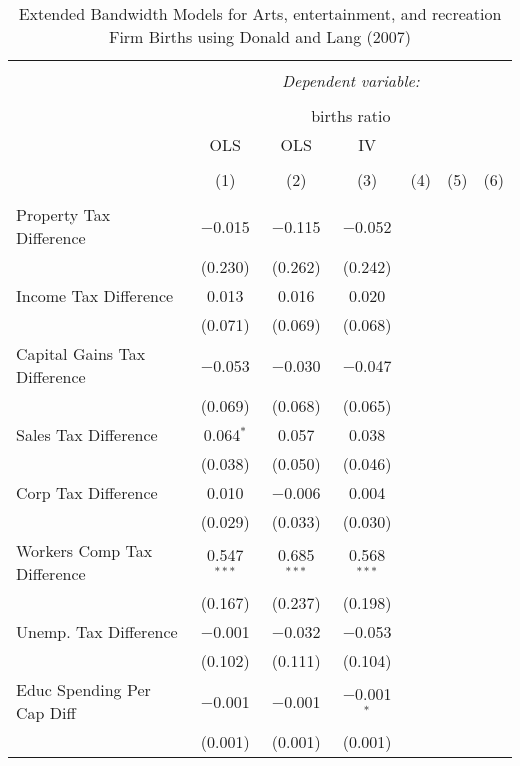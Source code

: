 
\begin{table}[!htbp] \centering 
  \caption{Extended Bandwidth Models for  Arts, entertainment, and recreation Firm Births using Donald and Lang (2007)} 
  \label{} 
\begin{tabular}{@{\extracolsep{5pt}}lcccccc} 
\\[-1.8ex]\hline 
\hline \\[-1.8ex] 
 & \multicolumn{6}{c}{\textit{Dependent variable:}} \\ 
\cline{2-7} 
\\[-1.8ex] & \multicolumn{6}{c}{births ratio} \\ 
 & OLS & OLS & IV &  &  &  \\ 
\\[-1.8ex] & (1) & (2) & (3) & (4) & (5) & (6)\\ 
\hline \\[-1.8ex] 
 Property Tax Difference & $-$0.015 & $-$0.115 & $-$0.052 &  &  &  \\ 
  & (0.230) & (0.262) & (0.242) &  &  &  \\ 
  Income Tax Difference & 0.013 & 0.016 & 0.020 &  &  &  \\ 
  & (0.071) & (0.069) & (0.068) &  &  &  \\ 
  Capital Gains Tax Difference & $-$0.053 & $-$0.030 & $-$0.047 &  &  &  \\ 
  & (0.069) & (0.068) & (0.065) &  &  &  \\ 
  Sales Tax Difference & 0.064$^{*}$ & 0.057 & 0.038 &  &  &  \\ 
  & (0.038) & (0.050) & (0.046) &  &  &  \\ 
  Corp Tax Difference & 0.010 & $-$0.006 & 0.004 &  &  &  \\ 
  & (0.029) & (0.033) & (0.030) &  &  &  \\ 
  Workers Comp Tax Difference & 0.547$^{***}$ & 0.685$^{***}$ & 0.568$^{***}$ &  &  &  \\ 
  & (0.167) & (0.237) & (0.198) &  &  &  \\ 
  Unemp. Tax Difference & $-$0.001 & $-$0.032 & $-$0.053 &  &  &  \\ 
  & (0.102) & (0.111) & (0.104) &  &  &  \\ 
  Educ Spending Per Cap Diff & $-$0.001 & $-$0.001 & $-$0.001$^{*}$ &  &  &  \\ 
  & (0.001) & (0.001) & (0.001) &  &  &  \\ 

\end{tabular}
\end{table}
